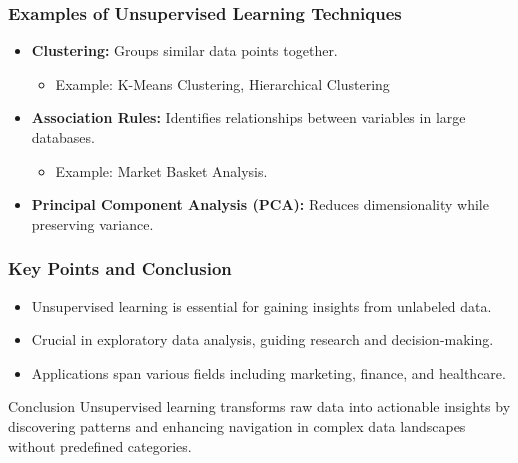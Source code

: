 \documentclass[aspectratio=169]{beamer}
\begin{document}
\begin{frame}[fragile]
    \frametitle{Examples of Unsupervised Learning Techniques}
    \begin{itemize}
        \item \textbf{Clustering:} Groups similar data points together.
            \begin{itemize}
                \item Example: K-Means Clustering, Hierarchical Clustering
            \end{itemize}
        \item \textbf{Association Rules:} Identifies relationships between variables in large databases.
            \begin{itemize}
                \item Example: Market Basket Analysis.
            \end{itemize}
        \item \textbf{Principal Component Analysis (PCA):} Reduces dimensionality while preserving variance.
    \end{itemize}
\end{frame}

\begin{frame}[fragile]
    \frametitle{Key Points and Conclusion}
    \begin{itemize}
        \item Unsupervised learning is essential for gaining insights from unlabeled data.
        \item Crucial in exploratory data analysis, guiding research and decision-making.
        \item Applications span various fields including marketing, finance, and healthcare.
    \end{itemize}
    \begin{block}{Conclusion}
        Unsupervised learning transforms raw data into actionable insights by discovering patterns and enhancing navigation in complex data landscapes without predefined categories.
    \end{block}
\end{frame}
\end{document}
